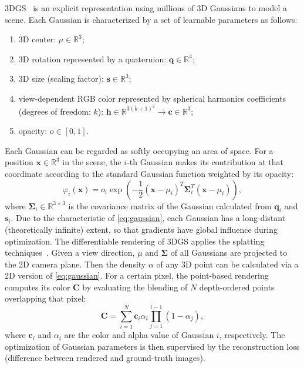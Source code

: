 \documentclass[runningheads]{llncs}
\begin{document}
3DGS~\cite{3dgs} is an explicit representation using millions of 3D Gaussians to model a scene. Each Gaussian is characterized by a set of learnable parameters as follows:
\begin{enumerate}[1)]
    \item 3D center: $\mu \in \mathbb{R}^3$;
    \item 3D rotation represented by a quaternion: $\mathbf{q} \in \mathbb{R}^4$;
    \item 3D size (scaling factor): $\mathbf{s} \in \mathbb{R}^3$;
    \item view-dependent RGB color represented by spherical harmonics coefficients (degrees of freedom: $k$): $\mathbf{h} \in \mathbb{R}^{3(k+1)^2} \rightarrow \mathbf{c} \in \mathbb{R}^3$;
    \item opacity: $o \in [0,1]$.
\end{enumerate}
Each Gaussian can be regarded as softly occupying an area of space.
For a position $\mathbf{x} \in \mathbb{R}^3$ in the scene, the $i$-th Gaussian makes its contribution at that coordinate according to the standard Gaussian function weighted by its opacity:
%
\begin{equation}
    \varphi_{i}(\mathbf{x}) = o_i \exp(-\frac{1}{2}(\mathbf{x}-\mu_i)^T\mathbf{\Sigma}_{i}^T(\mathbf{x}-\mu_i)),
\label{eq:gaussian}
\end{equation}
%
where $\mathbf{\Sigma}_{i}\in \mathbb{R}^{3\times3}$ is the covariance matrix of the Gaussian calculated from $\mathbf{q}_i$ and $\mathbf{s}_i$.
Due to the characteristic of \cref{eq:gaussian}, each Gaussian has a long-distant (theoretically infinite) extent, so that gradients have global influence during optimization.
The differentiable rendering of 3DGS applies the splatting techniques~\cite{3dgs}. Given a view direction, $\mu$ and $\mathbf{\Sigma}$ of all Gaussians are projected to the 2D camera plane. Then the density $\alpha$ of any 3D point can be calculated via a 2D version of \cref{eq:gaussian}. For a certain pixel, the point-based rendering computes its color $\mathbf{C}$ by evaluating the blending of $N$ depth-ordered points overlapping that pixel:
%
\begin{equation}
    \mathbf{C} = \sum_{i=1}^{N} \mathbf{c}_i \alpha_i \prod_{j=1}^{i-1}(1-\alpha_j),
\label{eq:render}
\end{equation}
%
where $\mathbf{c}_i$ and $\alpha_i$ are the color and alpha value of Gaussian $i$, respectively.
The optimization of Gaussian parameters is then supervised by the reconstruction loss (difference between rendered and ground-truth images).
\end{document}
